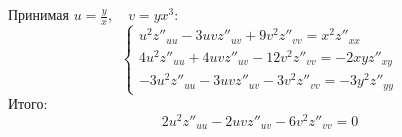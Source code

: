 \documentclass{article}
\begin{document}
Принимая $u = \frac{y}{x}, \quad v = yx^3$:
\begin{equation*}
    \begin{cases}
    u^2z''_{uu} - 3uvz''_{uv} + 9v^2 z''_{vv} = x^2 z''_{xx} \\
    4u^2 z''_{uu} + 4uv z''_{uv} - 12 v^2 z''_{vv} = -2xy z''_{xy} \\
    -3u^2 z''_{uu} - 3uv z''_{uv} - 3 v^2 z''_{vv} = -3y^2 z''_{yy}
    \end{cases}
\end{equation*}
Итого:
\[ 2u^2 z''_{uu} - 2uv z''_{uv} - 6v^2 z''_{vv} = 0 \]
\end{document}
